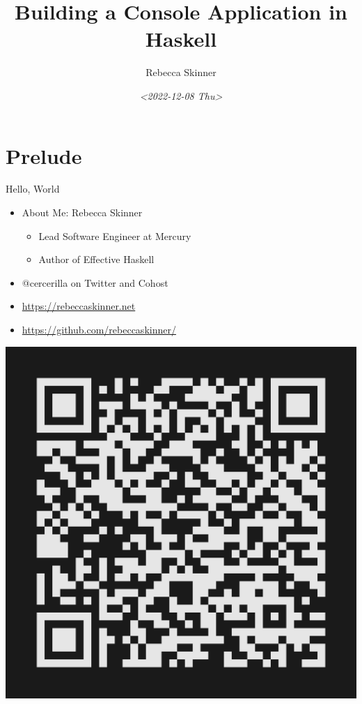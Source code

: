 \documentclass[10pt, presentation, colorlinks]{beamer}
\author{Rebecca Skinner}
\date{\textit{<2022-12-08 Thu>}}
\title{Building a Console Application in Haskell}
\begin{document}
\maketitle

\section{Prelude}
\label{sec:orgd96844c}

\begin{frame}[label={sec:orgab111da}]{Hello, World}
\begin{itemize}
\item About Me: Rebecca Skinner
\begin{itemize}
\item Lead Software Engineer at Mercury
\item Author of Effective Haskell
\end{itemize}
\item @cercerilla on Twitter and Cohost
\item \url{https://rebeccaskinner.net}
\item \url{https://github.com/rebeccaskinner/}
\end{itemize}

\begin{center}
\includegraphics[height=0.3\textheight]{img/url.png}
\end{center}
\end{frame}
\end{document}
